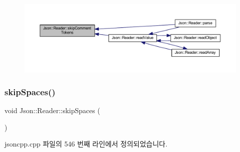 \begin{figure}[H]
\begin{center}
\leavevmode
\includegraphics[width=350pt]{class_json_1_1_reader_a22e677ef400d8223f27e631b4cd4b821_icgraph}
\end{center}
\end{figure}
\mbox{\label{class_json_1_1_reader_a40d0f69d15aeb2d52ff78d794f5ab8b2}} 
\subsubsection{\texorpdfstring{skip\+Spaces()}{skipSpaces()}}
{\footnotesize\ttfamily void Json\+::\+Reader\+::skip\+Spaces (\begin{DoxyParamCaption}{ }\end{DoxyParamCaption})\hspace{0.3cm}{\ttfamily [private]}}



jsoncpp.\+cpp 파일의 546 번째 라인에서 정의되었습니다.


